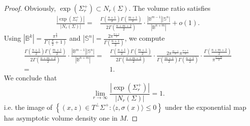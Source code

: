 \documentclass[11pt, reqno]{amsart}
\numberwithin{equation}{section}
\begin{document}
\begin{proof}
Obviously, $\exp(\Sigma^+_r)\subset N_r(\Sigma)$.
The volume ratio satisfies
\begin{align*}
\frac{|\exp(\Sigma^+_r)|}{|N_r(\Sigma)|}
=& \frac{\Gamma\left(\frac{n+1}{2}\right) \Gamma\left(\frac{m+1}{2}\right)}{2 \Gamma\left(\frac{n+m+2}{2}\right)}
\cdot\frac{\left|\mathbb{B}^{m-1}\right|\left|\mathbb{S}^n\right|}{\left|\mathbb{B}^{n+m}\right|} +o(1).
\end{align*}
Using $\left|\mathbb{B}^k\right|=\frac{\pi^{\frac{k}{2}}}{\Gamma\left(\frac{k}{2}+1\right)}$ and $\left|\mathbb{S}^n\right|=\frac{2 \pi^{\frac{ n+1 }{2}}}{\Gamma\left(\frac{n+1}{2}\right)}$, we compute
\begin{align*}
\frac{\Gamma\left(\frac{n+1}{2}\right) \Gamma\left(\frac{m+1}{2}\right)}{2 \Gamma\left(\frac{n+m+2}{2}\right)} \cdot \frac{\left|\mathbb{B}^{m-1}\right|\left|\mathbb{S}^n\right|}{\left|\mathbb{B}^{n+m}\right|}
=& \frac{\Gamma\left(\frac{n+1}{2}\right) \Gamma\left(\frac{m+1}{2}\right)}{2 \Gamma\left(\frac{n+m+2}{2}\right)} \cdot \frac{2 \pi^{\frac{ m-1 }{2} }\pi^{\frac{ n+1 }{2}}}{\Gamma\left(\frac{m+1}{2}\right) \Gamma\left(\frac{n+1}{2}\right)} \cdot \frac{\Gamma\left(\frac{n+m+2}{2}\right)}{\pi^{ \frac{n+m}{2} }}\\
=& 1.
\end{align*}
We conclude that
$$
\lim_{r\to\infty}\frac{\left|\exp \left(\Sigma_r^{+}\right)\right|}{\left|N_r(\Sigma)\right|}=1.
$$
i.e. the image of $\left\{(x, z) \in T^{\perp} \Sigma^{+}:\langle z, \sigma(x)\rangle \le 0\right\}$ under the exponential map has asymptotic volume density one in $M$.
\end{proof}
\end{document}
